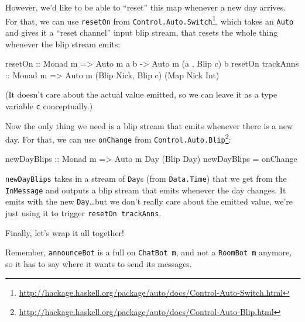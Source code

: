 \documentclass[]{article}
\newenvironment{Shaded}{}{}
\newcommand{\DataTypeTok}[1]{\textcolor[rgb]{0.56,0.13,0.00}{#1}}
\newcommand{\NormalTok}[1]{#1}
\newcommand{\OtherTok}[1]{\textcolor[rgb]{0.00,0.44,0.13}{#1}}
\renewcommand{\href}[2]{#2\footnote{\url{#1}}}
\begin{document}
However, we'd like to be able to ``reset'' this map whenever a new day arrives.
For that, we can use \texttt{resetOn} from
\href{http://hackage.haskell.org/package/auto/docs/Control-Auto-Switch.html}{\texttt{Control.Auto.Switch}},
which takes an \texttt{Auto} and gives it a ``reset channel'' input blip stream,
that resets the whole thing whenever the blip stream emits:

\begin{Shaded}
\begin{Highlighting}[]
\OtherTok{resetOn ::} \DataTypeTok{Monad}\NormalTok{ m }\OtherTok{=>} \DataTypeTok{Auto}\NormalTok{ m a b }\OtherTok{{-}>} \DataTypeTok{Auto}\NormalTok{ m (a        , }\DataTypeTok{Blip}\NormalTok{ c) b}
\NormalTok{resetOn}\OtherTok{ trackAnns ::} \DataTypeTok{Monad}\NormalTok{ m }\OtherTok{=>}     \DataTypeTok{Auto}\NormalTok{ m (}\DataTypeTok{Blip} \DataTypeTok{Nick}\NormalTok{, }\DataTypeTok{Blip}\NormalTok{ c) (}\DataTypeTok{Map} \DataTypeTok{Nick} \DataTypeTok{Int}\NormalTok{)}
\end{Highlighting}
\end{Shaded}

(It doesn't care about the actual value emitted, so we can leave it as a type
variable \texttt{c} conceptually.)

Now the only thing we need is a blip stream that emits whenever there is a new
day. For that, we can use \texttt{onChange} from
\href{http://hackage.haskell.org/package/auto/docs/Control-Auto-Blip.html}{\texttt{Control.Auto.Blip}}:

\begin{Shaded}
\begin{Highlighting}[]
\OtherTok{newDayBlips ::} \DataTypeTok{Monad}\NormalTok{ m }\OtherTok{=>} \DataTypeTok{Auto}\NormalTok{ m }\DataTypeTok{Day}\NormalTok{ (}\DataTypeTok{Blip} \DataTypeTok{Day}\NormalTok{)}
\NormalTok{newDayBlips }\OtherTok{=}\NormalTok{ onChange}
\end{Highlighting}
\end{Shaded}

\texttt{newDayBlips} takes in a stream of \texttt{Day}s (from
\texttt{Data.Time}) that we get from the \texttt{InMessage} and outputs a blip
stream that emits whenever the day changes. It emits with the new
\texttt{Day}\ldots but we don't really care about the emitted value, we're just
using it to trigger \texttt{resetOn\ trackAnns}.

Finally, let's wrap it all together!

Remember, \texttt{announceBot} is a full on \texttt{ChatBot\ m}, and not a
\texttt{RoomBot\ m} anymore, so it has to say where it wants to send its
messages.
\end{document}
